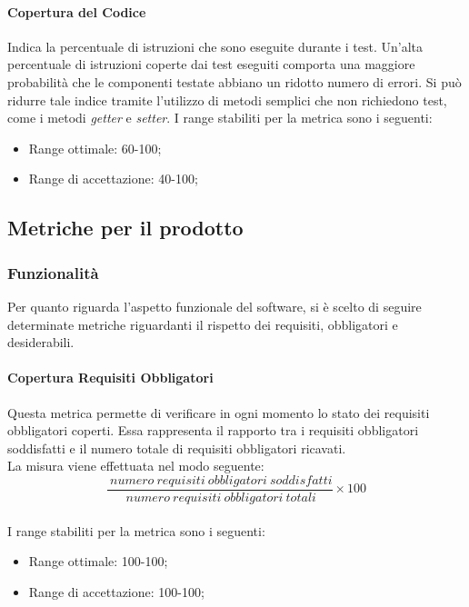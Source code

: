 			\paragraph{Copertura del Codice}
			Indica la percentuale di istruzioni che sono eseguite durante i test. Un'alta percentuale di istruzioni coperte dai test eseguiti comporta una maggiore probabilità che le componenti testate abbiano un ridotto numero di errori. Si può ridurre tale indice tramite l'utilizzo di metodi semplici che non richiedono test, come i metodi \textit{getter} e \textit{setter}.
			I range stabiliti per la metrica sono i seguenti:
				\begin{itemize}
					\item Range ottimale: 60-100;
					\item Range di accettazione: 40-100;
				\end{itemize}
				
	\subsection{Metriche per il prodotto}
		\subsubsection{Funzionalità \label{S1}}
		Per quanto riguarda l'aspetto funzionale del software, si è scelto di seguire determinate metriche riguardanti il rispetto dei requisiti, obbligatori e desiderabili.
			\paragraph{Copertura Requisiti Obbligatori}
			Questa metrica permette di verificare in ogni momento lo stato dei requisiti obbligatori coperti. Essa rappresenta il rapporto tra i requisiti obbligatori soddisfatti e il numero totale di requisiti obbligatori ricavati.
			\\La misura viene effettuata nel modo seguente:
			\begin{equation}
			\frac{~numero~requisiti~obbligatori~soddisfatti}{~numero~requisiti~obbligatori~totali}\times{100}
			\end{equation}
			\\I range stabiliti per la metrica sono i seguenti:
			\begin{itemize}
				\item Range ottimale: 100-100;
				\item Range di accettazione: 100-100;
			\end{itemize}
			
